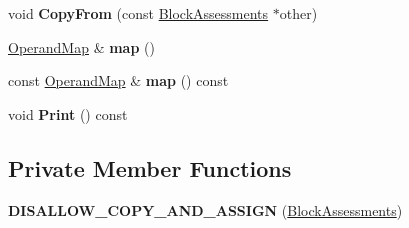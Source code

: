 \begin{DoxyCompactItemize}
\item 
void {\bfseries Copy\+From} (const \hyperlink{classv8_1_1internal_1_1compiler_1_1_block_assessments}{Block\+Assessments} $\ast$other)\hypertarget{classv8_1_1internal_1_1compiler_1_1_block_assessments_a61768a55893c2e2c08b5de928d3708ac}{}\label{classv8_1_1internal_1_1compiler_1_1_block_assessments_a61768a55893c2e2c08b5de928d3708ac}

\item 
\hyperlink{classv8_1_1internal_1_1_zone_map}{Operand\+Map} \& {\bfseries map} ()\hypertarget{classv8_1_1internal_1_1compiler_1_1_block_assessments_ac12e8c9f7acbd913d5b04639fbcc463d}{}\label{classv8_1_1internal_1_1compiler_1_1_block_assessments_ac12e8c9f7acbd913d5b04639fbcc463d}

\item 
const \hyperlink{classv8_1_1internal_1_1_zone_map}{Operand\+Map} \& {\bfseries map} () const \hypertarget{classv8_1_1internal_1_1compiler_1_1_block_assessments_a79b8430b1a353d6ce2a8edb487514963}{}\label{classv8_1_1internal_1_1compiler_1_1_block_assessments_a79b8430b1a353d6ce2a8edb487514963}

\item 
void {\bfseries Print} () const \hypertarget{classv8_1_1internal_1_1compiler_1_1_block_assessments_a32a2269aae98f454665ea36fbc10d237}{}\label{classv8_1_1internal_1_1compiler_1_1_block_assessments_a32a2269aae98f454665ea36fbc10d237}

\end{DoxyCompactItemize}
\subsection*{Private Member Functions}
\begin{DoxyCompactItemize}
\item 
{\bfseries D\+I\+S\+A\+L\+L\+O\+W\+\_\+\+C\+O\+P\+Y\+\_\+\+A\+N\+D\+\_\+\+A\+S\+S\+I\+GN} (\hyperlink{classv8_1_1internal_1_1compiler_1_1_block_assessments}{Block\+Assessments})\hypertarget{classv8_1_1internal_1_1compiler_1_1_block_assessments_acefebf04f149c047b1bede0082d03906}{}\label{classv8_1_1internal_1_1compiler_1_1_block_assessments_acefebf04f149c047b1bede0082d03906}

\end{DoxyCompactItemize}
